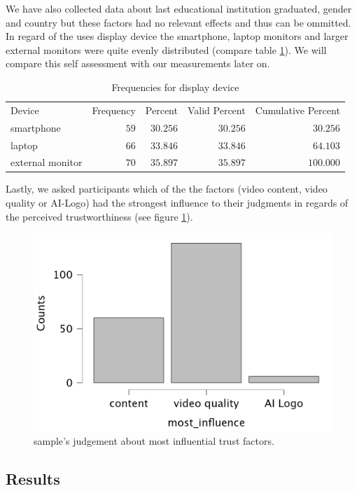 \documentclass[
  a4paper,  %
  twoside,  %
  bibliography=totoc,
  headsepline,
  cleardoublepage=empty,
  parskip=half,
  draft=false
]{scrbook}
\begin{document}
We have also collected data about last educational institution graduated, gender and country but these factors had no relevant effects and thus can be ommitted. \\
In regard of the uses display device the smartphone, laptop monitors and larger external monitors were quite evenly distributed (compare table \ref{tab:frequenciesForDevice}). We will compare this self assessment with our measurements later on.
\begin{table}[h]
	\centering
	\caption{Frequencies for display device}
	\label{tab:frequenciesForDevice}
	{
		\begin{tabular}{lrrrr}
			\toprule
			Device & Frequency & Percent & Valid Percent & Cumulative Percent  \\
			\cmidrule[0.4pt]{1-5}
			smartphone & $59$ & $30.256$ & $30.256$ & $30.256$  \\
			laptop & $66$ & $33.846$ & $33.846$ & $64.103$  \\
			external monitor & $70$ & $35.897$ & $35.897$ & $100.000$  \\
			\bottomrule
		\end{tabular}
	}
\end{table}
Lastly, we asked participants which of the the factors (video content, video quality or AI-Logo) had the strongest influence to their judgments in regards of the perceived trustworthiness (see figure \ref{fig:most-influence}).
\begin{figure}[h]
  \centering
  \includegraphics[width=.5\textwidth]{graphics/images/statistics/most-influence.png}
  \caption{sample's judgement about most influential trust factors.}
  \label{fig:most-influence}
\end{figure} 

\subsection{Results}
\end{document}

